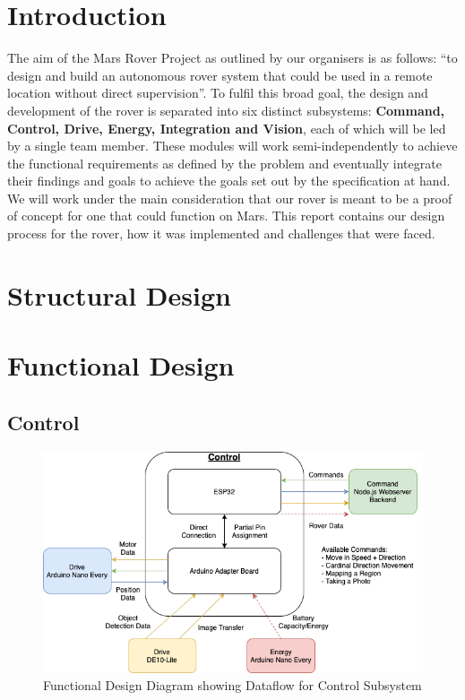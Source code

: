 \documentclass[a4paper]{article}
\begin{document}
\newpage

\section{Introduction}

The aim of the Mars Rover Project as outlined by our organisers is as 
follows: “to design and build an autonomous rover system that could be 
used in a remote location without direct  supervision”\cite{MarsRoverSpec}.  
To fulfil this broad goal, the design and development of the rover is separated into 
six distinct subsystems: \textbf{Command, Control, Drive, Energy, Integration and Vision},
each of which will be led by a single team member. These modules will work semi-independently to 
achieve the functional requirements as defined by the problem and 
eventually integrate their findings and goals to achieve the goals set out by the specification 
at hand. We will work under the main consideration that our rover is meant 
to be a proof of concept for one that could function on Mars. This report 
contains our design process for the rover, how it was implemented and challenges that were faced. 

\section{Structural Design}

\section{Functional Design}

\subsection{Control}

\begin{figure}[H]
	\begin{Center}
		\includegraphics[scale = 0.5]{./images/ControlFR.png}
		\caption{Functional Design Diagram showing Dataflow for Control Subsystem}
		\label{fig:DesiredVisionResult}
	\end{Center}
\end{figure}
\end{document}
